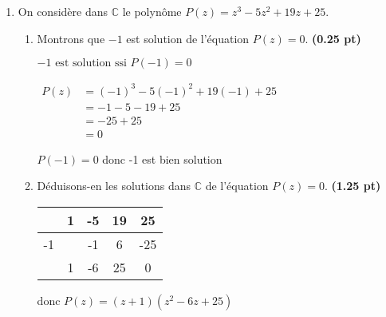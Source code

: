 \documentclass[12pt,a4paper]{article}
\begin{document}
\begin{enumerate}
    \item On considère dans \( \mathbb{C} \) le polynôme \( P(z) = z^3 - 5z^2 + 19z + 25 \).
    \begin{enumerate}
        \item Montrons que \( -1 \) est solution de l’équation \( P(z) = 0 \). \hfill \textbf{(0.25 pt)}
        
        \(-1 \text{ est solution ssi } P(-1) = 0 \)
        
        \(
        \begin{aligned}
        P(z) &= (-1)^3 - 5(-1)^2 + 19(-1) + 25\\
        		 &= -1 - 5 - 19 + 25\\ 
        		 &= -25 + 25\\ 
        		 &=0      
        \end{aligned}
        \)

$P(-1) = 0$ donc -1 est bien solution  
     
        \item Déduisons-en les solutions dans \( \mathbb{C} \) de l’équation \( P(z) = 0 \). \hfill \textbf{(1.25 pt)}
        
\begin{tabular}{|c|c|c|c|c|}
        \hline
        & 1  & -5 & 19 & 25\\ 
        \hline
        -1 &   & -1 & 6 & -25\\ 
        \hline
        & 1  & -6 & 25 & 0\\ 
        \hline
\end{tabular} 

donc  \( P(z) = (z+1)(z^{2}-6z+25) \)


\end{enumerate}
\end{enumerate}
\end{document}
